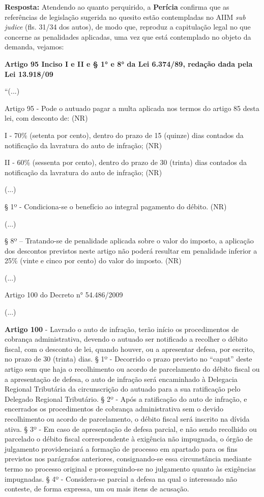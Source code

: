 \textbf{Resposta:} Atendendo ao quanto perquirido, a \textbf{Perícia} confirma que as referências de legislação sugerida no quesito estão contempladas no AIIM \textit{sub judice} (fls. 31/34 dos autos), de modo que, reproduz a capitulação legal no que concerne as penalidades aplicadas, uma vez que está contemplado no objeto da demanda, vejamos:

\textbf{Artigo 95 Inciso I e II e § 1° e 8° da Lei 6.374/89, redação dada pela Lei 13.918/09}

“(...)

Artigo 95 - Pode o autuado pagar a multa aplicada nos termos do artigo 85 desta lei, com desconto de: (NR)

I - 70\% (setenta por cento), dentro do prazo de 15 (quinze) dias contados da notificação da lavratura do auto de infração; (NR)

II - 60\% (sessenta por cento), dentro do prazo de 30 (trinta) dias contados da notificação da lavratura do auto de infração; (NR)

(...)

§ 1º - Condiciona-se o benefício ao integral pagamento do débito. (NR)

(...)

§ 8º – Tratando-se de penalidade aplicada sobre o valor do imposto, a aplicação dos descontos previstos neste artigo não poderá resultar em penalidade inferior a 25\% (vinte e cinco por cento) do valor do imposto. (NR)

(...)

Artigo 100 do Decreto n° 54.486/2009

(...) 

\textbf{Artigo 100} - Lavrado o auto de infração, terão início os procedimentos de cobrança administrativa, devendo o autuado ser notificado a recolher o débito fiscal, com o desconto de lei, quando houver, ou a apresentar defesa, por escrito, no prazo de 30 (trinta) dias.
§ 1º - Decorrido o prazo previsto no “caput” deste artigo sem que haja o recolhimento ou acordo de parcelamento do débito fiscal ou a apresentação de defesa, o auto de infração será encaminhado à Delegacia Regional Tributária da circunscrição do autuado para a sua ratificação pelo Delegado Regional Tributário.
§ 2º - Após a ratificação do auto de infração, e encerrados os procedimentos de cobrança administrativa sem o devido recolhimento ou acordo de parcelamento, o débito fiscal será inscrito na dívida ativa.
§ 3º - Em caso de apresentação de defesa parcial, e não sendo recolhido ou parcelado o débito fiscal correspondente à exigência não impugnada, o órgão de julgamento providenciará a formação de processo em apartado para os fins previstos nos parágrafos anteriores, consignando-se essa circunstância mediante termo no processo original e prosseguindo-se no julgamento quanto às exigências impugnadas.
§ 4º - Considera-se parcial a defesa na qual o interessado não conteste, de forma expressa, um ou mais itens de acusação.

